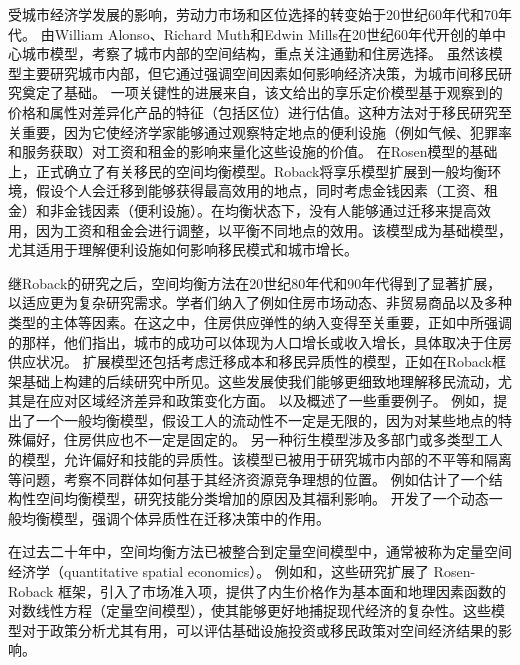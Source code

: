 \documentclass[a4paper, zihao=-4, fontset = mac, oneside]{ctexbook} %
\begin{document}
受城市经济学发展的影响，劳动力市场和区位选择的转变始于20世纪60年代和70年代。
由William Alonso、Richard Muth和Edwin Mills在20世纪60年代开创的单中心城市模型，考察了城市内部的空间结构，重点关注通勤和住房选择。
虽然该模型主要研究城市内部，但它通过强调空间因素如何影响经济决策，为城市间移民研究奠定了基础。
一项关键性的进展来自\textcite{rosenHedonicPricesImplicit1974}，该文给出的享乐定价模型基于观察到的价格和属性对差异化产品的特征（包括区位）进行估值。这种方法对于移民研究至关重要，因为它使经济学家能够通过观察特定地点的便利设施（例如气候、犯罪率和服务获取）对工资和租金的影响来量化这些设施的价值。
在Rosen模型的基础上，\textcite{robackWagesRentsQuality1982}正式确立了有关移民的空间均衡模型。Roback将享乐模型扩展到一般均衡环境，假设个人会迁移到能够获得最高效用的地点，同时考虑金钱因素（工资、租金）和非金钱因素（便利设施）。在均衡状态下，没有人能够通过迁移来提高效用，因为工资和租金会进行调整，以平衡不同地点的效用。该模型成为基础模型，尤其适用于理解便利设施如何影响移民模式和城市增长。

继Roback的研究之后，空间均衡方法在20世纪80年代和90年代得到了显著扩展，以适应更为复杂研究需求。学者们纳入了例如住房市场动态、非贸易商品以及多种类型的主体等因素。在这之中，住房供应弹性的纳入变得至关重要，正如\textcite{glaeserWealthCitiesAgglomeration2009}中所强调的那样，他们指出，城市的成功可以体现为人口增长或收入增长，具体取决于住房供应状况。
扩展模型还包括考虑迁移成本和移民异质性的模型，正如在Roback框架基础上构建的后续研究中所见。这些发展使我们能够更细致地理解移民流动，尤其是在应对区域经济差异和政策变化方面。
\textcite{glaeserWealthCitiesAgglomeration2009}以及\textcite{morettiLocalLaborMarkets2011}概述了一些重要例子。
例如，\textcite{morettiLocalLaborMarkets2011}提出了一个一般均衡模型，假设工人的流动性不一定是无限的，因为对某些地点的特殊偏好，住房供应也不一定是固定的。
另一种衍生模型涉及多部门或多类型工人的模型，允许偏好和技能的异质性。该模型已被用于研究城市内部的不平等和隔离等问题，考察不同群体如何基于其经济资源竞争理想的位置。
例如\textcite{diamondDeterminantsWelfareImplications2016}估计了一个结构性空间均衡模型，研究技能分类增加的原因及其福利影响。
\textcite{coen-piraniEffectHouseholdAppliances2010}开发了一个动态一般均衡模型，强调个体异质性在迁移决策中的作用。

在过去二十年中，空间均衡方法已被整合到定量空间模型中，通常被称为定量空间经济学（quantitative spatial economics）。
例如\textcite{ahlfeldtEconomicsDensityEvidence2015}和\textcite{reddingQuantitativeSpatialEconomics2017}，这些研究扩展了 Rosen-Roback 框架，引入了市场准入项，提供了内生价格作为基本面和地理因素函数的对数线性方程（定量空间模型），使其能够更好地捕捉现代经济的复杂性。这些模型对于政策分析尤其有用，可以评估基础设施投资或移民政策对空间经济结果的影响。
\end{document}
